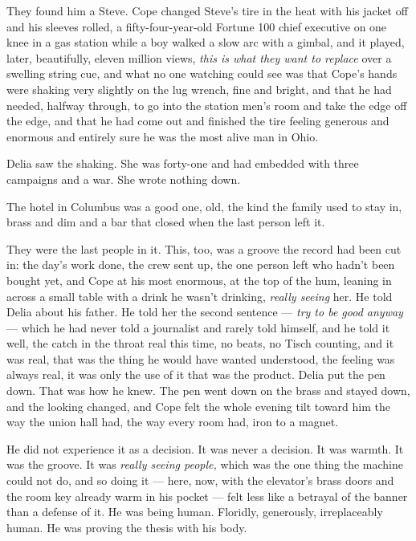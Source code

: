 \documentclass[11pt,openany]{book}
\newcommand{\scenebreak}{\par\vspace{0.5\baselineskip}\begin{center}\textasteriskcentered\quad\textasteriskcentered\quad\textasteriskcentered\end{center}\vspace{0.5\baselineskip}\par}
\begin{document}
They found him a Steve. Cope changed Steve's tire in the heat with his jacket off and his sleeves rolled, a fifty-four-year-old Fortune 100 chief executive on one knee in a gas station while a boy walked a slow arc with a gimbal, and it played, later, beautifully, eleven million views, \textit{this is what they want to replace} over a swelling string cue, and what no one watching could see was that Cope's hands were shaking very slightly on the lug wrench, fine and bright, and that he had needed, halfway through, to go into the station men's room and take the edge off the edge, and that he had come out and finished the tire feeling generous and enormous and entirely sure he was the most alive man in Ohio.

Delia saw the shaking. She was forty-one and had embedded with three campaigns and a war. She wrote nothing down.


\scenebreak


The hotel in Columbus was a good one, old, the kind the family used to stay in, brass and dim and a bar that closed when the last person left it.

They were the last people in it. This, too, was a groove the record had been cut in: the day's work done, the crew sent up, the one person left who hadn't been bought yet, and Cope at his most enormous, at the top of the hum, leaning in across a small table with a drink he wasn't drinking, \textit{really seeing} her. He told Delia about his father. He told her the second sentence --- \textit{try to be good anyway} --- which he had never told a journalist and rarely told himself, and he told it well, the catch in the throat real this time, no beats, no Tisch counting, and it was real, that was the thing he would have wanted understood, the feeling was always real, it was only the use of it that was the product. Delia put the pen down. That was how he knew. The pen went down on the brass and stayed down, and the looking changed, and Cope felt the whole evening tilt toward him the way the union hall had, the way every room had, iron to a magnet.

He did not experience it as a decision. It was never a decision. It was warmth. It was the groove. It was \textit{really seeing people,} which was the one thing the machine could not do, and so doing it --- here, now, with the elevator's brass doors and the room key already warm in his pocket --- felt less like a betrayal of the banner than a defense of it. He was being human. Floridly, generously, irreplaceably human. He was proving the thesis with his body.
\end{document}
